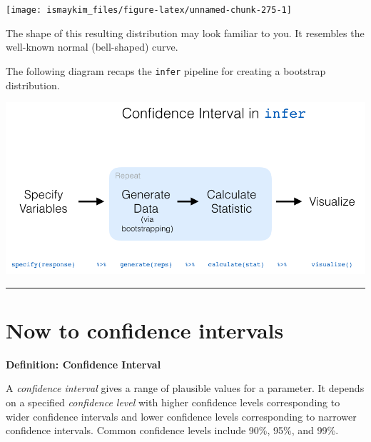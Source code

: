 \documentclass[12pt, krantz2,]{krantz}
\makeatletter
\newenvironment{Shaded}{\begin{snugshade}}{\end{snugshade}}
\newcommand{\KeywordTok}[1]{\textcolor[rgb]{0.27,0.27,0.27}{\textbf{#1}}}
\newcommand{\NormalTok}[1]{#1}
\newcommand{\OperatorTok}[1]{\textcolor[rgb]{0.43,0.43,0.43}{\textbf{#1}}}
\newcommand{\StringTok}[1]{\textcolor[rgb]{0.5,0.5,0.5}{#1}}
\newenvironment{kframe}{%
\medskip{}
\setlength{\fboxsep}{.8em}
 \def\at@end@of@kframe{}%
 \ifinner\ifhmode%
  \def\at@end@of@kframe{\end{minipage}}%
  \begin{minipage}{\columnwidth}%
 \fi\fi%
 \def\FrameCommand##1{\hskip\@totalleftmargin \hskip-\fboxsep
 \colorbox{shadecolor}{##1}\hskip-\fboxsep
     \hskip-\linewidth \hskip-\@totalleftmargin \hskip\columnwidth}%
 \MakeFramed {\advance\hsize-\width
   \@totalleftmargin\z@ \linewidth\hsize
   \@setminipage}}%
 {\par\unskip\endMakeFramed%
 \at@end@of@kframe}
\renewenvironment{Shaded}{\begin{kframe}}{\end{kframe}}
\makeatother
\begin{document}
\begin{Shaded}
\end{Shaded}

\begin{center}\texttt{[image: ismaykim\_files/figure-latex/unnamed-chunk-275-1]} \end{center}

The shape of this resulting distribution may look familiar to you. It resembles the well-known normal (bell-shaped) curve.

The following diagram recaps the \texttt{infer} pipeline for creating a bootstrap distribution.

\begin{center}\includegraphics[width=\textwidth]{images/flowcharts/infer/ci_diagram} \end{center}

\begin{center}\rule{0.5\linewidth}{\linethickness}\end{center}

\hypertarget{now-to-confidence-intervals}{%
\section{Now to confidence intervals}\label{now-to-confidence-intervals}}

\textbf{Definition: Confidence Interval}

A \emph{confidence interval} gives a range of plausible values for a parameter. It depends on a specified \emph{confidence level} with higher confidence levels corresponding to wider confidence intervals and lower confidence levels corresponding to narrower confidence intervals. Common confidence levels include 90\%, 95\%, and 99\%.
\end{document}
